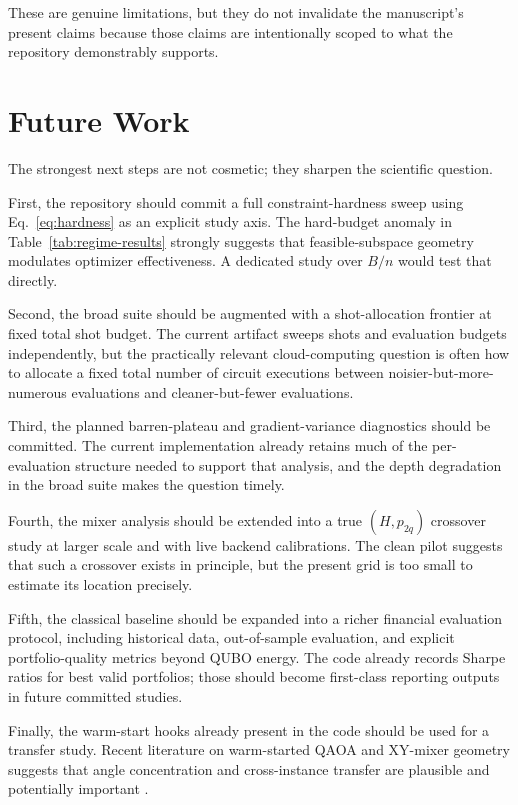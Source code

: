 \documentclass[11pt]{article}
\begin{document}
These are genuine limitations, but they do not invalidate the manuscript's present claims because those claims are intentionally scoped to what the repository demonstrably supports.

\section{Future Work}\label{sec:future}

The strongest next steps are not cosmetic; they sharpen the scientific question.

First, the repository should commit a full constraint-hardness sweep using Eq.~\eqref{eq:hardness} as an explicit study axis. The hard-budget anomaly in Table~\ref{tab:regime-results} strongly suggests that feasible-subspace geometry modulates optimizer effectiveness. A dedicated study over \(B/n\) would test that directly.

Second, the broad suite should be augmented with a shot-allocation frontier at fixed total shot budget. The current artifact sweeps shots and evaluation budgets independently, but the practically relevant cloud-computing question is often how to allocate a fixed total number of circuit executions between noisier-but-more-numerous evaluations and cleaner-but-fewer evaluations.

Third, the planned barren-plateau and gradient-variance diagnostics should be committed. The current implementation already retains much of the per-evaluation structure needed to support that analysis, and the depth degradation in the broad suite makes the question timely.

Fourth, the mixer analysis should be extended into a true \((H,p_{2q})\) crossover study at larger scale and with live backend calibrations. The clean pilot suggests that such a crossover exists in principle, but the present grid is too small to estimate its location precisely.

Fifth, the classical baseline should be expanded into a richer financial evaluation protocol, including historical data, out-of-sample evaluation, and explicit portfolio-quality metrics beyond QUBO energy. The code already records Sharpe ratios for best valid portfolios; those should become first-class reporting outputs in future committed studies.

Finally, the warm-start hooks already present in the code should be used for a transfer study. Recent literature on warm-started QAOA and \(\mathrm{XY}\)-mixer geometry suggests that angle concentration and cross-instance transfer are plausible and potentially important \cite{egger2021warm,kordonowy2026lie,mancilla2026portfolio}.
\end{document}
